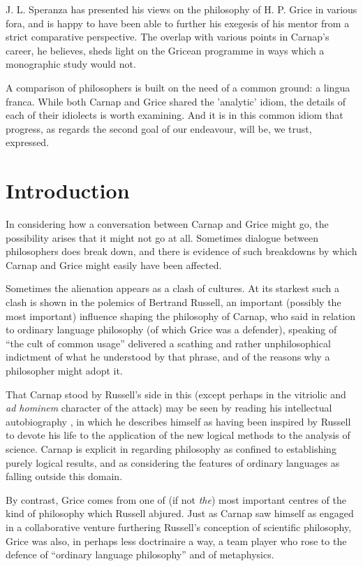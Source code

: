 \documentclass[10pt,titlepage]{book}
\begin{document}
J. L. Speranza has presented his views on the philosophy of H. P. Grice in  
various fora, and is happy to have been able to further his exegesis of his 
 mentor from a strict comparative perspective. The overlap with various  
points in Carnap's career, he believes, sheds light on the Gricean programme 
in  ways which a monographic study would not. 
 
A comparison of philosophers is built on the need of a common ground: a  
lingua franca. While both Carnap and Grice shared the 'analytic' idiom, the  
details of each of their idiolects is worth examining. And it is in this 
common  idiom that progress, as regards the second goal of our endeavour, will  
be, we trust, expressed.  

\chapter{Introduction}

In considering how a conversation between Carnap and Grice might go, the possibility arises that it might not go at all.
Sometimes dialogue between philosophers does break down, and there is evidence of such breakdowns by which Carnap and Grice might easily have been affected.

Sometimes the alienation appears as a clash of cultures.
At its starkest such a clash is shown in the polemics of Bertrand Russell, an important (possibly the most important) influence shaping the philosophy of Carnap, who said in relation to ordinary language philosophy (of which Grice was a defender), speaking of ``the cult of common usage'' delivered a scathing and rather unphilosophical indictment of what he understood by that phrase, and of the reasons why a philosopher might adopt it.

That Carnap stood by Russell's side in this (except perhaps in the vitriolic and \emph{ad hominem} character of the attack) may be seen by reading his intellectual autobiography \cite{carnap63a}, in which he describes himself as having been inspired by Russell to devote his life to the application of the new logical methods to the analysis of science.
Carnap is explicit in regarding philosophy as confined to establishing purely logical results, and as considering the features of ordinary languages as falling outside this domain.

By contrast, Grice comes from one of (if not {\it the}) most important centres of the kind of philosophy which Russell abjured.
Just as Carnap saw himself as engaged in a collaborative venture furthering Russell's conception of scientific philosophy, Grice was also, in perhaps less doctrinaire a way, a team player who rose to the defence of ``ordinary language philosophy'' and of metaphysics.
\end{document}
